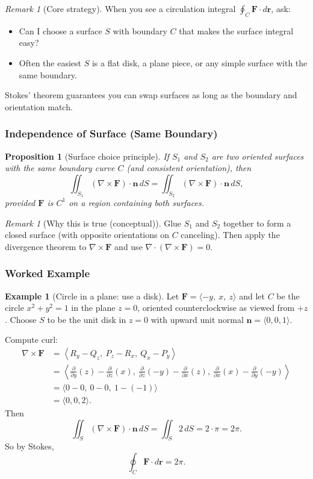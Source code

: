 \documentclass[12pt]{article}
\numberwithin{equation}{section}
\newcommand{\vect}[1]{\boldsymbol{#1}}   %
\theoremstyle{plain}
\newtheorem{proposition}[theorem]{Proposition}
\theoremstyle{definition}
\newtheorem{example}[theorem]{Example}
\theoremstyle{remark}
\newtheorem{remark}[theorem]{Remark}
\begin{document}
\begin{remark}[Core strategy]
When you see a circulation integral $\oint_C \vect F\cdot d\vect r$, ask:
\begin{itemize}
\item Can I choose a surface $S$ with boundary $C$ that makes the surface integral easy?
\item Often the easiest $S$ is a flat disk, a plane piece, or any simple surface with the same boundary.
\end{itemize}
Stokes' theorem guarantees you can swap surfaces as long as the boundary and orientation match.
\end{remark}

\subsubsection{Independence of Surface (Same Boundary)}

\begin{proposition}[Surface choice principle]\label{prop:surface-choice}
If $S_1$ and $S_2$ are two oriented surfaces with the same boundary curve $C$ (and consistent orientation), then
\[
\iint_{S_1} (\nabla\times \vect F)\cdot \vect n\,dS
=
\iint_{S_2} (\nabla\times \vect F)\cdot \vect n\,dS,
\]
provided $\vect F$ is $C^1$ on a region containing both surfaces.
\end{proposition}

\begin{remark}[Why this is true (conceptual)]
Glue $S_1$ and $S_2$ together to form a closed surface (with opposite orientations on $C$ canceling). Then apply the divergence theorem to $\nabla\times \vect F$ and use $\nabla\cdot(\nabla\times \vect F)=0$.
\end{remark}

\subsubsection{Worked Example}

\begin{example}[Circle in a plane: use a disk]\label{ex:stokes9-circle}
Let $\vect F=\langle -y,\ x,\ z\rangle$ and let $C$ be the circle $x^2+y^2=1$ in the plane $z=0$, oriented counterclockwise as viewed from $+z$.
Choose $S$ to be the unit disk in $z=0$ with upward unit normal $\vect n=\langle 0,0,1\rangle$.

Compute curl:
\begin{align*}
\nabla\times \vect F
&= \left\langle R_y-Q_z,\ P_z-R_x,\ Q_x-P_y \right\rangle \\
&= \left\langle
\frac{\partial}{\partial y}(z)-\frac{\partial}{\partial z}(x),\
\frac{\partial}{\partial z}(-y)-\frac{\partial}{\partial x}(z),\
\frac{\partial}{\partial x}(x)-\frac{\partial}{\partial y}(-y)
\right\rangle \\
&= \langle 0-0,\ 0-0,\ 1-(-1)\rangle \\
&= \langle 0,0,2\rangle.
\end{align*}
Then
\[
\iint_S (\nabla\times \vect F)\cdot \vect n\,dS
=
\iint_S 2\,dS
=
2\cdot \pi
=
2\pi.
\]
So by Stokes,
\[
\oint_C \vect F\cdot d\vect r=2\pi.
\]
\end{example}
\end{document}
